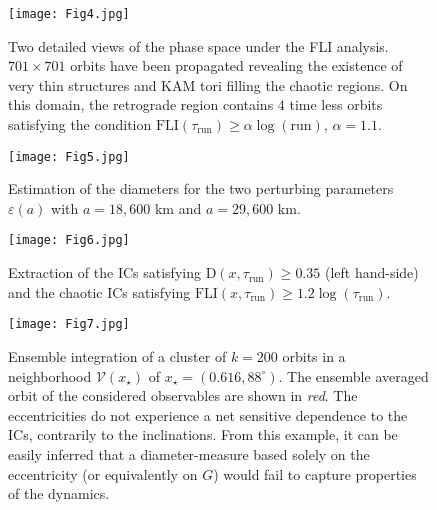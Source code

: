 \documentclass{amsart}
\theoremstyle{definition}
\theoremstyle{remark}
\numberwithin{equation}{section}
\begin{document}
\begin{figure}
\centering
\texttt{[image: Fig4.jpg]}\\
\caption{\label{Fig:MicroProRetro}
Two detailed views of the phase space under the FLI analysis. 
$701 \times 701$ orbits have been propagated revealing the 
existence of very thin structures and KAM tori filling the chaotic regions. On this domain, the retrograde region contains $4$ time less orbits satisfying the condition $\textrm{FLI}(\tau_{\textrm{run}}) \ge \alpha \log(\textrm{run})$, $\alpha=1.1$. 
}
\end{figure}

\begin{figure}
\centering   
   \texttt{[image: Fig5.jpg]}
 \caption{\label{fig:Diameters} 
Estimation of the diameters for the two perturbing parameters $\varepsilon(a)$ with $a=18,600$ km and $a=29,600$ km.
} 
\end{figure} 


\begin{figure}
\centering
   \texttt{[image: Fig6.jpg]} 
  \caption{\label{Fig:FLIvsD} 
Extraction of the ICs satisfying $\textrm{D}(x,\tau_{\textrm{run}}) \ge 0.35$ (left hand-side) and the chaotic ICs satisfying 
$\textrm{FLI}(x,\tau_{\textrm{run}}) \ge 1.2 \log (\tau_{\textrm{run}})$.
} 	
\end{figure}

\begin{figure}
\centering
\texttt{[image: Fig7.jpg]}
\caption{\label{fig:EnsembleDiameter} Ensemble integration of a cluster of $k=200$ orbits in a neighborhood $\mathcal{V}(x_{\star})$ of  $x_{\star}\!=\!(0.616,88^{\circ})$. The ensemble averaged orbit of the considered observables are shown in {\it red}. 
The eccentricities do not experience a net sensitive dependence to the ICs, contrarily to the inclinations. From this example, it can be easily {\color{black}inferred} that a diameter-measure based solely on the eccentricity (or equivalently on $G$) would fail to capture properties of the dynamics.}
\end{figure}
\end{document}
